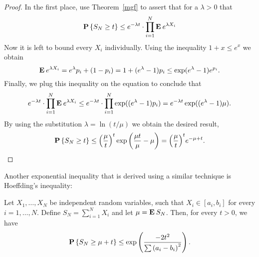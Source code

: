 \begin{proof}
  In the first place, use Theorem~\ref{mgf} to assert that for a $\lambda > 0$ that
  \[\P\left\{  S_N \geq t\right\} \leq e^{-\lambda t}\cdot \prod_{i = 1}^N \E e^{\lambda X_i} \] 
  Now it is left to bound every $X_i$ individually. Using the inequality $1+x \leq e^x$ we obtain
  \[ \E e^{\lambda X_i} = e^{\lambda}p_i + (1-p_i) = 1 + (e^{\lambda}-1)p_i  \leq \exp(e^{\lambda}-1)e^{p_i}.\]
  Finally, we plug this inequality on the equation to conclude that
  \[e^{-\lambda t}\cdot \prod_{i = 1}^N \E e^{\lambda X_i} \leq e^{-\lambda t}\cdot \prod_{i = 1}^N \exp((e^{\lambda}-1) p_i) = e^{-\lambda t} \exp((e^{\lambda}-1) \mu). \]
  By using the substitution $\lambda = \ln (t/\mu)$ we obtain the desired result,
  \[ \P\left\{  S_N \geq t\right\} \leq {\left(\frac{\mu}{t}\right)}^t \exp{\left(\frac{\mu t}{\mu}-\mu\right)} = {\left(\frac{\mu}{t}\right)}^t e^{-\mu+t}. \]
\end{proof}

Another exponential inequality that is derived using a similar technique is Hoeffding's inequality:

\begin{theorem}\label{hoeffding:bernoulli}
  Let $X_1, \ldots, X_N$ be independent random variables, such that $X_i \in [a_i,b_i]$ for every $i = 1,\ldots,N$. Define $S_N = \sum_{i = 1}^{N} X_i$ and let $\mu = \E S_N$. Then, for every $t > 0$, we have
  \[ \P\left\{  S_N \geq \mu + t\right\} \leq \exp\left( \frac{-2t^2}{\sum{( a_i - b_i )}^2}\right). \]
\end{theorem}

